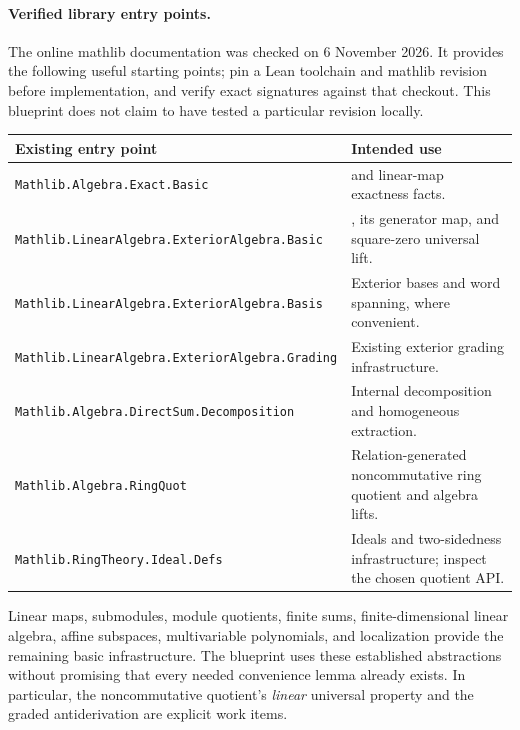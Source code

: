 \documentclass[11pt]{article}
\newcommand{\planned}[1]{\texttt{\detokenize{#1}}}
\theoremstyle{definition}
\theoremstyle{remark}
\begin{document}
\paragraph{Verified library entry points.}
The online mathlib documentation was checked on 6 November 2026. It provides the following useful starting points; pin a Lean toolchain and mathlib revision before implementation, and verify exact signatures against that checkout. This blueprint does not claim to have tested a particular revision locally.
\begin{longtable}{@{}p{}p{}@{}}
\toprule
Existing entry point & Intended use\\\midrule\endhead
\nolinkurl{Mathlib.Algebra.Exact.Basic} & \planned{Function.Exact} and linear-map exactness facts.\\
\nolinkurl{Mathlib.LinearAlgebra.ExteriorAlgebra.Basic} & \planned{ExteriorAlgebra}, its generator map, and square-zero universal lift.\\
\nolinkurl{Mathlib.LinearAlgebra.ExteriorAlgebra.Basis} & Exterior bases and word spanning, where convenient.\\
\nolinkurl{Mathlib.LinearAlgebra.ExteriorAlgebra.Grading} & Existing exterior grading infrastructure.\\
\nolinkurl{Mathlib.Algebra.DirectSum.Decomposition} & Internal decomposition and homogeneous extraction.\\
\nolinkurl{Mathlib.Algebra.RingQuot} & Relation-generated noncommutative ring quotient and algebra lifts.\\
\nolinkurl{Mathlib.RingTheory.Ideal.Defs} & Ideals and two-sidedness infrastructure; inspect the chosen quotient API.\\
\bottomrule
\end{longtable}

Linear maps, submodules, module quotients, finite sums, finite-dimensional linear algebra, affine subspaces, multivariable polynomials, and localization provide the remaining basic infrastructure. The blueprint uses these established abstractions without promising that every needed convenience lemma already exists. In particular, the noncommutative quotient's \emph{linear} universal property and the graded antiderivation are explicit work items.
\end{document}
